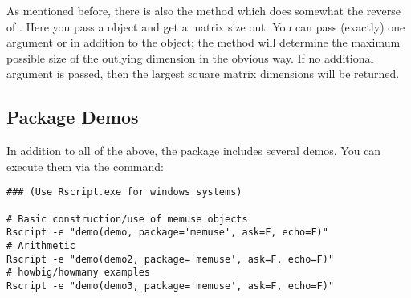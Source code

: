 As mentioned before, there is also the  method which does somewhat the reverse of .  Here you pass a  object and get a matrix size out.  You can pass (exactly) one argument  or  in addition to the  object; the method will determine the maximum possible size of the outlying dimension in the obvious way.  If no additional argument is passed, then the largest square matrix dimensions will be returned.



\subsection{Package Demos}

In addition to all of the above, the  package includes several demos.  You can execute them via the command:
\begin{lstlisting}[title=List of Demos]
### (Use Rscript.exe for windows systems)

# Basic construction/use of memuse objects
Rscript -e "demo(demo, package='memuse', ask=F, echo=F)"
# Arithmetic
Rscript -e "demo(demo2, package='memuse', ask=F, echo=F)"
# howbig/howmany examples
Rscript -e "demo(demo3, package='memuse', ask=F, echo=F)"
\end{lstlisting}
